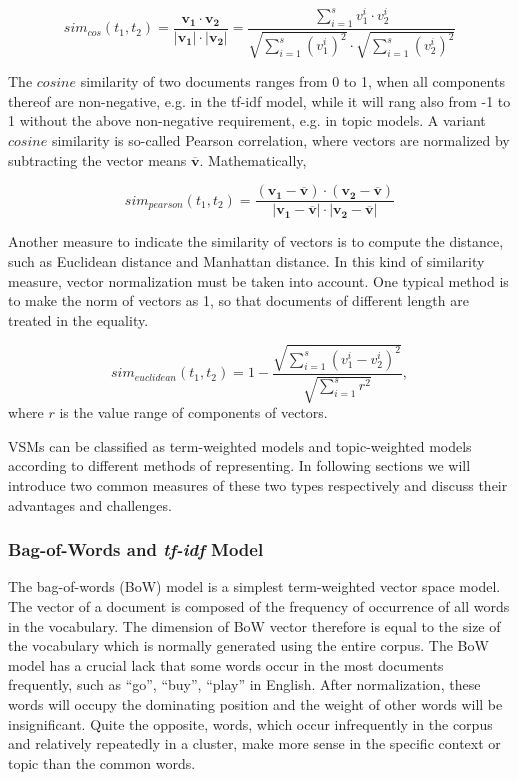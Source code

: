 \begin{equation}
    sim_{cos}(t_1, t_2) = \frac{\mathbf{v_1} \cdot \mathbf{v_2}}{|\mathbf{v_1}| \cdot |\mathbf{v_2}|} = \frac{\sum_{i=1}^s v_1^i \cdot v_2^i}{\sqrt{\sum_{i=1}^s (v_1^i)^2} \cdot \sqrt{\sum_{i=1}^s (v_2^i)^2}}
\end{equation}

The $cosine$ similarity of two documents ranges from 0 to 1, when all components thereof are non-negative, e.g. in the tf-idf model, while it will rang also from -1 to 1 without the above non-negative requirement, e.g. in topic models. A variant $cosine$ similarity is so-called Pearson correlation, where vectors are normalized by subtracting the vector means $\mathbf{\overline{v}}$.  Mathematically, 

\begin{equation}
    sim_{pearson}(t_1, t_2) = \frac{(\mathbf{v_1-\overline{v}}) \cdot (\mathbf{v_2-\overline{v}})}{|\mathbf{v_1-\overline{v}}| \cdot |\mathbf{v_2}-\mathbf{\overline{v}}|}
\end{equation}

Another measure to indicate the similarity of vectors is to compute the distance, such as Euclidean distance and Manhattan distance. In this kind of similarity measure, vector normalization must be taken into account. One typical method is to make the norm of vectors as 1, so that documents of different length are treated in the equality. 

\begin{equation}
    sim_{euclidean}(t_1, t_2) = 1 - \frac{\sqrt{\sum_{i=1}^s (v_1^i-v_2^i)^2}}{\sqrt{\sum_{i=1}^s r^2}} ,
\end{equation}
where $r$ is the value range of components of vectors.

VSMs can be classified as term-weighted models and topic-weighted models according to different methods of representing. In following sections we will introduce two common measures of these two types respectively and discuss their advantages and challenges. 

\subsubsection{Bag-of-Words and \textit{tf-idf} Model}

The bag-of-words (BoW) model is a simplest term-weighted vector space model. The vector of a document is composed of the frequency of occurrence of all words in the vocabulary. The dimension of BoW vector therefore is equal to the size of the vocabulary which is normally generated using the entire corpus. The BoW model has a crucial lack that some words occur in the most documents frequently, such as ``go'', ``buy'', ``play'' in English. After normalization, these words will occupy the dominating position and the weight of other words will be	insignificant. Quite the opposite, words, which occur infrequently in the corpus and relatively repeatedly in a cluster, make more sense in the specific context or topic than the common words. 

